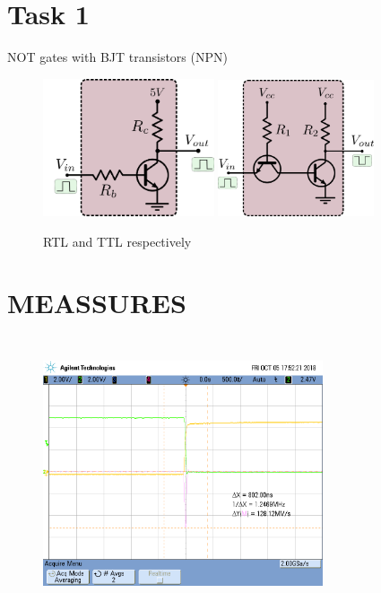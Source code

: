 \newpage
\section*{Task 1}
NOT gates with BJT transistors (NPN)

\begin{figure}[H] 
\begin{center}
\includegraphics[width=0.45\textwidth]{data/1a.png}
\includegraphics[width=0.41\textwidth]{data/1b.png}
\end{center}
\caption{RTL and TTL respectively}
\label{fig:ej1a}
\end{figure} 


\section*{MEASSURES}
\begin{figure}[H] 
\begin{center}
\includegraphics[width=8.25cm,height=8cm]{data/imax1.png}
\end{center}
\caption{}
\label{fig:measures}
\end{figure} 

